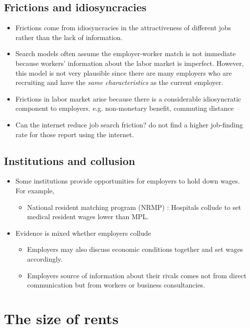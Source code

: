 \documentclass[a4paper, 12pt]{article}
\begin{document}
\subsection{Frictions and idiosyncracies}
\begin{itemize}
\item Frictions come from idiosyncracies in the attractiveness of different jobs rather than the lack of information.
\item Search models often assume the employer-worker match is not immediate because workers' information about the labor market is imperfect. However, this model is not very plausible since there are many employers who are recruiting and have the \emph{same characteristics} as the current employer. 
\item Frictions in labor market arise because there is a considerable idiosyncratic component to employers. e.g. non-monetary benefit, commuting distance
\item Can the internet reduce job search friction? \cite{kuhn2004internet} do not find a higher job-finding rate for those report using the internet.
\end{itemize}

\subsection{Institutions and collusion}
\begin{itemize}
\item Some institutions provide opportunities for employers to hold down wages. For example,
\begin{itemize}
\item National resident matching program (NRMP) : Hospitals collude to set medical resident wages lower than MPL.
\end{itemize}
\item Evidence is mixed whether employers collude
\begin{itemize}
\item Employers may also discuss economic conditions together and set wages accordingly.
\item Employers source of information about their rivals comes not from direct communication but from workers or business consultancies.
\end{itemize}
\end{itemize}

\section{The size of rents}
\end{document}
